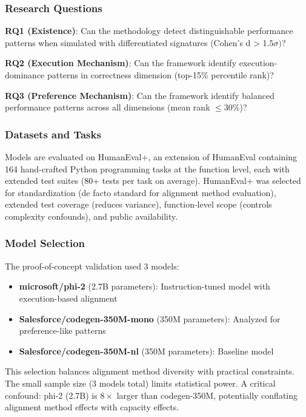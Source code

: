 
\subsubsection{Research Questions}

\textbf{RQ1 (Existence)}: Can the methodology detect distinguishable performance patterns when simulated with differentiated signatures (Cohen's d > 1.$5\sigma )$?

\textbf{RQ2 (Execution Mechanism)}: Can the framework identify execution-dominance patterns in correctness dimension (top-15\% percentile rank)?

\textbf{RQ3 (Preference Mechanism)}: Can the framework identify balanced performance patterns across all dimensions (mean rank $\leq 30$\%)?

\subsubsection{Datasets and Tasks}

Models are evaluated on HumanEval+, an extension of HumanEval containing 164 hand-crafted Python programming tasks at the function level, each with extended test suites (80+ tests per task on average). HumanEval+ was selected for standardization (de facto standard for alignment method evaluation), extended test coverage (reduces variance), function-level scope (controls complexity confounds), and public availability.

\subsubsection{Model Selection}

The proof-of-concept validation used 3 models:

\begin{itemize}
\item \textbf{microsoft/phi-2} (2.7B parameters): Instruction-tuned model with execution-based alignment
\item \textbf{Salesforce/codegen-350M-mono} (350M parameters): Analyzed for preference-like patterns
\item \textbf{Salesforce/codegen-350M-nl} (350M parameters): Baseline model
\end{itemize}

This selection balances alignment method diversity with practical constraints. The small sample size (3 models total) limits statistical power. A critical confound: phi-2 (2.7B) is $8\times$ larger than codegen-350M, potentially conflating alignment method effects with capacity effects.

